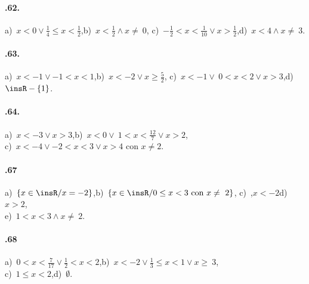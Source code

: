 \paragraph{\thechapter.62.} a)~$x<0\vee\frac{1}{4}\le x<\frac{1}{2}$,\quad b)~$x<\frac{1}{2}\wedge x\neq~0$,\quad
c)~$-\frac{1}{2}<x<\frac{1}{10}\vee x>\frac{1}{2}$,\quad d)~$x<4\wedge x\neq~3$.

\paragraph{\thechapter.63.} a)~$x<-1\vee -1<x<1$,\quad b)~$x<-2\vee x\ge \frac{5}{2}$,\quad
c)~$x<-1\vee~0<x<2\vee x>3$,\quad d)~$\insR-\{1\}$.

\paragraph{\thechapter.64.} a)~$x<-3\vee x>3$,\quad b)~$x<0\vee~1<x<\frac{12}{7}\vee x>2$,\quad
\protect\\ c)~$x<-4\vee -2<x<3\vee x>4\text{ con }x\neq2$.

\paragraph{\thechapter.67} a)~$\left\{x\in\insR/x=-2\right\}$,\quad b)~$\left\{x\in \insR/0\le x<3\text{ con }x\neq~2\right\}$,\quad
c)~,$x<-2$\quad d)~$x>2$,\quad
\protect\\ e)~$1<x<3\wedge x\neq~2$.

\paragraph{\thechapter.68} a)~$0<x<\frac{7}{17}\vee\frac{1}{2}<x<2$,\quad b)~$x<-2\vee \frac{1}{3}\le x<1\vee x\ge~3$,\quad
\protect\\ c)~$1\le x<2$,\quad d)~$\emptyset $.
